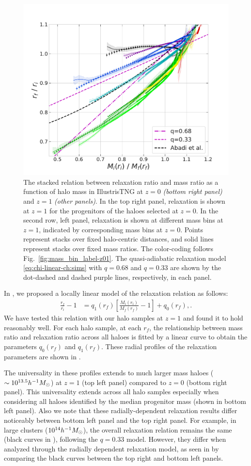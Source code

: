 \begin{figure}
\includegraphics[width=0.48\linewidth]{plots/fit_view_M_T_snap098.pdf}
\caption{The stacked relation between relaxation ratio and mass ratio as a function of halo mass in IllustrisTNG at $z=0$ \emph{(bottom right panel)} and $z=1$ \emph{(other panels)}. In the top right panel, relaxation is shown at $z=1$ for the progenitors of the haloes selected at $z=0$. In the second row, left panel, relaxation is shown at different mass bins at $z=1$, indicated by corresponding mass bins at $z=0$. Points represent stacks over fixed halo-centric distances, and solid lines represent stacks over fixed mass ratios. The color-coding follows Fig.~\ref{fig:mass_bin_label-z01}. The quasi-adiabatic relaxation model \eqref{eq:chi-linear-ch:sims} with $q=0.68$ and $q=0.33$ are shown by the dot-dashed and dashed purple lines, respectively, in each panel.}
\label{fig:fit-view-mass-indep}
\end{figure}

In , we proposed a locally linear model of the relaxation relation as follows:
\begin{align}
\label{eq:chi-linear-q0-ch:physvar}
\frac{r_f}{r_i} - 1 &= q_1(r_f) \left[ \frac{M_i(r_i)}{M_f(r_f)} - 1 \right] + q_0(r_f),.
\end{align}
We have tested this relation with our halo samples at $z=1$ and found it to hold reasonably well. For each halo sample, at each $r_f$, the relationship between mass ratio and relaxation ratio across all haloes is fitted by a linear curve to obtain the parameters $q_0(r_f)$ and $q_1(r_f)$. These radial profiles of the relaxation parameters are shown in .

The universality in these profiles extends to much larger mass haloes ($\sim 10^{13.5} h^{-1}M_{\odot}$) at $z=1$ (top left panel) compared to $z=0$ (bottom right panel). This universality extends across all halo samples especially when considering all haloes identified by the median progenitor mass (shown in bottom left panel). Also we note that these radially-dependent relaxation results differ noticeably between bottom left panel and the top right panel. For example, in large clusters ($10^{14} h^{-1}M_{\odot}$), the overall relaxation relation remains the same (black curves in ), following the $q=0.33$ model. However, they differ when analyzed through the radially dependent relaxation model, as seen in  by comparing the black curves between the top right and bottom left panels.

